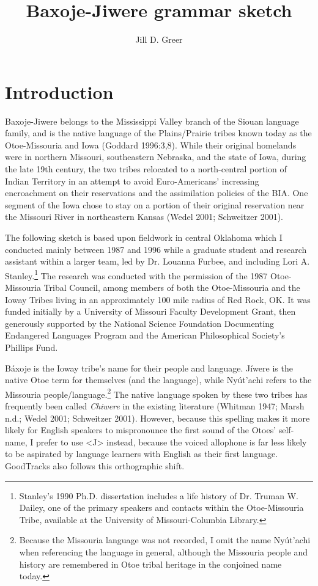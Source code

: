 \documentclass[output=paper]{LSP/langsci}
\author{Jill D. Greer}
\title{Baxoje-Jiwere grammar sketch }
\begin{document}
\section{Introduction}

Baxoje-Jiwere belongs to the Mississippi Valley branch of the Siouan language family, and is the native language of the Plains/Prairie tribes known today as the Otoe-Missouria and Iowa (Goddard 1996:3,8).  While their original homelands were in northern Missouri, southeastern Nebraska, and the state of Iowa, during the late 19th century, the two tribes relocated to a north-central portion of Indian Territory in an attempt to avoid Euro-Americans' increasing encroachment on their reservations and the assimilation policies of the BIA.  One segment of the Iowa chose to stay on a portion of their original reservation near the Missouri River in northeastern Kansas (Wedel 2001; Schweitzer 2001).  

The following sketch is based upon fieldwork in central Oklahoma which I conducted mainly between 1987 and 1996 while a graduate student and research assistant within a larger team, led by Dr. Louanna Furbee, and including Lori A. Stanley.\footnote{Stanley's 1990 Ph.D. dissertation includes a life history of Dr. Truman W. Dailey, one of the primary speakers and contacts within the Otoe-Missouria Tribe, available at the University of Missouri-Columbia Library.} The research was conducted with the permission of the 1987 Otoe-Missouria Tribal Council, among members of both the Otoe-Missouria and the Ioway Tribes living in an approximately 100 mile radius of Red Rock, OK.  It was funded initially by a University of Missouri Faculty Development Grant, then generously supported by the National Science Foundation Documenting Endangered Languages Program and the American Philosophical Society's Phillips Fund.

B\'axoje is the Ioway tribe's name for their people and language.  J\'iwere is the native Otoe term for themselves (and the language), while Ny\'ut'achi refers to the Missouria people/language.\footnote{Because the Missouria language was not recorded, I omit the name Ny\'ut'achi  when referencing the language in general, although the Missouria people and history are remembered in Otoe tribal heritage in the conjoined name today.} The native language spoken by these two tribes has frequently been called \textit{Chiwere} in the existing literature (Whitman 1947; Marsh n.d.; Wedel 2001; Schweitzer 2001).  However, because this spelling makes it more likely for English speakers to mispronounce the first sound of the Otoes' self-name, I prefer to use <J> instead, because the voiced allophone is far less likely to be aspirated by language learners with English as their first language.  GoodTracks also follows this orthographic shift.  
\end{document}
